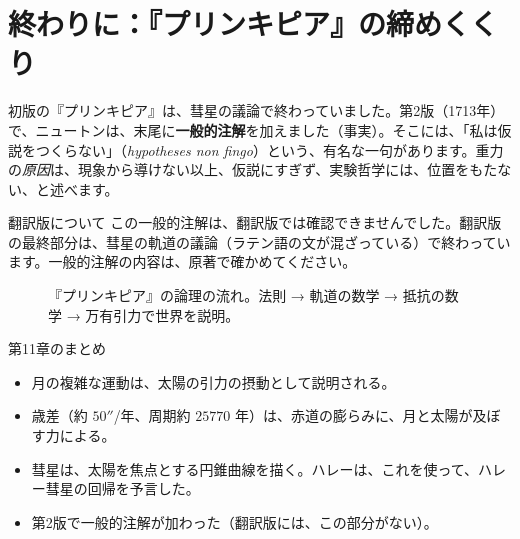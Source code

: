 \documentclass[a4paper,11pt,openany]{ltjsbook}
\begin{document}
\section{終わりに：『プリンキピア』の締めくくり}

初版の『プリンキピア』は、彗星の議論で終わっていました。第2版（1713年）で、ニュートンは、末尾に\textbf{一般的注解}を加えました（事実）。そこには、「私は仮説をつくらない」（\textit{hypotheses non fingo}）という、有名な一句があります。重力の\emph{原因}は、現象から導けない以上、仮説にすぎず、実験哲学には、位置をもたない、と述べます。

\begin{notebox}{翻訳版について}
この一般的注解は、翻訳版では確認できませんでした。翻訳版の最終部分は、彗星の軌道の議論（ラテン語の文が混ざっている）で終わっています。一般的注解の内容は、原著で確かめてください。
\end{notebox}

\begin{figure}[htbp]
\centering
{}
\caption{『プリンキピア』の論理の流れ。法則 → 軌道の数学 → 抵抗の数学 → 万有引力で世界を説明。}
\end{figure}

\begin{pointbox}{第11章のまとめ}
\begin{itemize}[leftmargin=1.5em]
\item 月の複雑な運動は、太陽の引力の摂動として説明される。
\item 歳差（約 $50''$/年、周期約 $25770$ 年）は、赤道の膨らみに、月と太陽が及ぼす力による。
\item 彗星は、太陽を焦点とする円錐曲線を描く。ハレーは、これを使って、ハレー彗星の回帰を予言した。
\item 第2版で一般的注解が加わった（翻訳版には、この部分がない）。
\end{itemize}
\end{pointbox}
\end{document}
